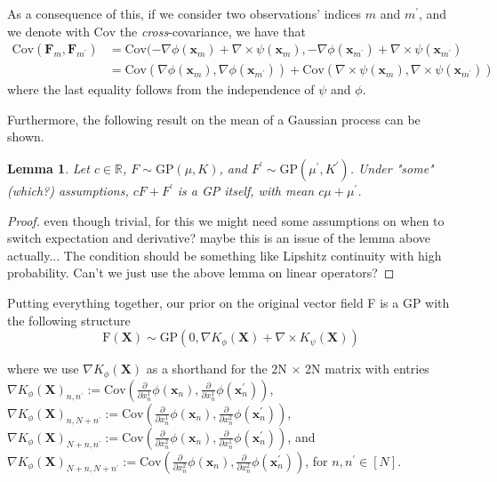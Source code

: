 \documentclass[11pt,a4paper]{article}
\newtheorem{lemma}{Lemma}
\begin{document}
As a consequence of this, if we consider two observations' indices $m$ and $m^\prime$, and we denote with $\text{Cov}$ the \textit{cross}-covariance, we have that 
\begin{align*}
    \text{Cov}(\textbf{F}_m, \textbf{F}_{m^\prime})  
    &= \text{Cov}(-\nabla \phi(\textbf{x}_m) + \nabla \times \psi(\textbf{x}_m) , -\nabla \phi(\textbf{x}_{m^\prime})+\nabla \times \psi(\textbf{x}_{m^\prime}) \\
    &= \text{Cov}(\nabla \phi(\textbf{x}_m), \nabla \phi(\textbf{x}_{m^\prime})) + \text{Cov}(\nabla \times \psi(\textbf{x}_m), \nabla \times \psi(\textbf{x}_{m^\prime}))
\end{align*}
where the last equality follows from the independence of $\psi$ and $\phi$. 

Furthermore, the following result on the mean of a Gaussian process can be shown. 

\begin{lemma}
Let $c \in \mathbb{R}$, $F \sim \text{GP}(\mu, K)$, and $F^\prime \sim \text{GP}(\mu^\prime, K^\prime)$. Under "some" (which?) assumptions, $cF + F^\prime$ is a GP itself, with mean $c\mu + \mu^\prime$.
\end{lemma}


\begin{proof}
even though trivial, for this we might need some assumptions on when to switch expectation and derivative? maybe this is an issue of the lemma above actually... The condition should be something like Lipshitz continuity with high probability. 
Can't we just use the above lemma on linear operators?
\end{proof}


Putting everything together, our prior on the original vector field F is a GP with the following structure
\begin{equation}
    \text{F}(\textbf{X}) \sim \text{GP}(0, \nabla K_{\phi}(\textbf{X}) + \nabla \times K_{\psi}(\textbf{X}))
\end{equation}



where we use $\nabla K_{\phi}(\textbf{X})$ as a shorthand for the 2N $\times$ 2N matrix with entries $\nabla K_{\phi}(\textbf{X})_{n,n^\prime} := \text{Cov}\left(\frac{\partial}{\partial x_n^1} \phi(\textbf{x}_n), \frac{\partial}{\partial x_n^1} \phi(\textbf{x}_n^\prime)\right)$, $\nabla K_{\phi}(\textbf{X})_{n,N + n^\prime} := \text{Cov}\left(\frac{\partial}{\partial x_n^1} \phi(\textbf{x}_n), \frac{\partial}{\partial x_n^2} \phi(\textbf{x}_n^\prime)\right)$, $\nabla K_{\phi}(\textbf{X})_{N + n,n^\prime} := \text{Cov}\left(\frac{\partial}{\partial x_n^2} \phi(\textbf{x}_n), \frac{\partial}{\partial x_n^1} \phi(\textbf{x}_n^\prime)\right)$, and $\nabla K_{\phi}(\textbf{X})_{N + n, N + n^\prime} := \text{Cov}\left(\frac{\partial}{\partial x_n^2} \phi(\textbf{x}_n), \frac{\partial}{\partial x_n^2} \phi(\textbf{x}_n^\prime)\right)$, for $n, n^\prime \in [N]$. \newline
\end{document}
